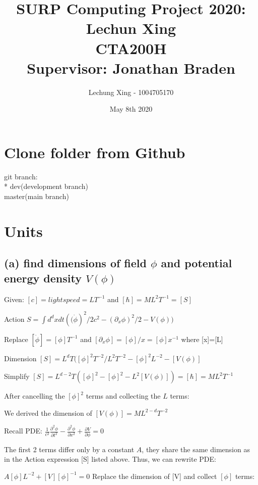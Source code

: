 \documentclass{article}
\title{SURP Computing Project 2020: Lechun Xing \\ CTA200H \\ Supervisor: Jonathan Braden}
\author{Lechung Xing - 1004705170 }
\date{May 8th 2020}
\begin{document}
\maketitle
\section{Clone folder from Github}
git branch:\\ * dev(development branch)\\   master(main branch)
\section{Units}
\subsection{(a) find dimensions of field $\phi$ and potential energy density $V(\phi)$}
Given: $[c]=light speed=LT^{-1}$ and 
$[\hbar]=ML^2{T^{-1}}=[S]$

\vspace{3mm}
Action $S=\int{d^d{x}dt({(\dot{\phi}})^2}/{2c^2}-{(\partial_x{\phi})^2}/2-V(\phi))$

\vspace{3mm}
Replace
$[\dot{\phi}]=[\phi]T^{-1}$ and
$[\partial_x{\phi}]=[\phi]/x=[\phi]x^{-1}$ where [x]=[L]

\vspace{3mm}
Dimension $[S]=L^d{T}({[\phi]^2{T^{-2}}}/L^2{T^{-2}}-[\phi]^2{L^{-2}}-[V(\phi)]$

\vspace{3mm}
Simplify $[S]={L^{d-2}T}({[\phi]^2}-[\phi]^2-L^2[V(\phi)])=[\hbar]=ML^2{T^{-1}}$

\vspace{3mm}
After cancelling the ${[\phi]^2}$ terms and collecting the $L$ terms:

\vspace{3mm}
We derived the dimension of 
$[V(\phi)]=ML^{2-d}T^{-2}$

\vspace{5mm}
Recall PDE: $\frac{1}{c^2}{\frac{\partial^2\phi}{\partial{t^2}}}-{\frac{\partial^2\phi}{\partial{x^2}}}+{\frac{\partial{V}}{\partial{\phi}}}=0$

\vspace{3mm}
The first 2 terms differ only by a constant $A$, they share the same dimension as in the Action expression [S] listed above. Thus, we can rewrite PDE:

\vspace{3mm}
$A[\phi]L^{-2}+[V][\phi]^{-1}=0$ Replace the dimension of [V] and collect $[\phi]$ terms:
\end{document}
